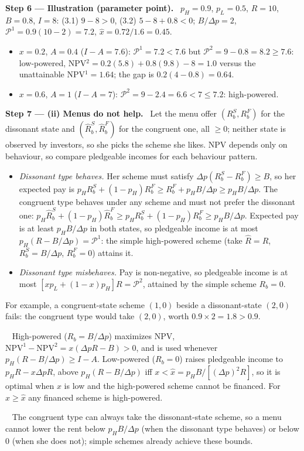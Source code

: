 \documentclass[11pt,a4paper]{article}
\newcommand{\step}[2]{\par\medskip\noindent\textbf{Step #1 --- #2.}~}
\newcommand{\answer}[1]{\par\smallskip\noindent\fbox{\textbf{Answer #1.}}~}
\newcommand{\dpp}{\Delta p}
\begin{document}
\step{6}{Illustration (parameter point)} $p_H=0.9$, $p_L=0.5$, $R=10$, $B=0.8$, $I=8$: (3.1) $9-8>0$, (3.2) $5-8+0.8<0$; $B/\dpp=2$, $\mathcal P^1=0.9(10-2)=7.2$, $\hat x=0.72/1.6=0.45$.
\begin{itemize}
  \item $x=0.2$, $A=0.4$ ($I-A=7.6$): $\mathcal P^1=7.2<7.6$ but $\mathcal P^2=9-0.8=8.2\ge7.6$: low-powered, NPV$^2=0.2(5.8)+0.8(9.8)-8=1.0$ versus the unattainable NPV$^1=1.64$; the gap is $0.2(4-0.8)=0.64$.
  \item $x=0.6$, $A=1$ ($I-A=7$): $\mathcal P^2=9-2.4=6.6<7\le7.2$: high-powered.
\end{itemize}

\step{7}{(ii) Menus do not help} Let the menu offer $(R^S_b,R^F_b)$ for the dissonant state and $(\hat R^S_b,\hat R^F_b)$ for the congruent one, all $\ge0$; neither state is observed by investors, so she picks the scheme she likes. NPV depends only on behaviour, so compare pledgeable incomes for each behaviour pattern.
\begin{itemize}
  \item \emph{Dissonant type behaves.} Her scheme must satisfy $\dpp(R^S_b-R^F_b)\ge B$, so her expected pay is $p_HR^S_b+(1-p_H)R^F_b\ge R^F_b+p_HB/\dpp\ge p_HB/\dpp$. The congruent type behaves under any scheme and must not prefer the dissonant one: $p_H\hat R^S_b+(1-p_H)\hat R^F_b\ge p_HR^S_b+(1-p_H)R^F_b\ge p_HB/\dpp$. Expected pay is at least $p_HB/\dpp$ in both states, so pledgeable income is at most $p_H(R-B/\dpp)=\mathcal P^1$: the simple high-powered scheme (take $\hat R=R$, $R^S_b=B/\dpp$, $R^F_b=0$) attains it.
  \item \emph{Dissonant type misbehaves.} Pay is non-negative, so pledgeable income is at most $[xp_L+(1-x)p_H]R=\mathcal P^2$, attained by the simple scheme $R_b=0$.
\end{itemize}
For example, a congruent-state scheme $(1,0)$ beside a dissonant-state $(2,0)$ fails: the congruent type would take $(2,0)$, worth $0.9\times2=1.8>0.9$.

\answer{(i)} High-powered ($R_b=B/\dpp$) maximizes NPV, $\mathrm{NPV}^1-\mathrm{NPV}^2=x(\dpp R-B)>0$, and is used whenever $p_H(R-B/\dpp)\ge I-A$. Low-powered ($R_b=0$) raises pledgeable income to $p_HR-x\dpp R$, above $p_H(R-B/\dpp)$ iff $x<\hat x=p_HB/[(\dpp)^2R]$, so it is optimal when $x$ is low and the high-powered scheme cannot be financed. For $x\ge\hat x$ any financed scheme is high-powered.
\answer{(ii)} The congruent type can always take the dissonant-state scheme, so a menu cannot lower the rent below $p_HB/\dpp$ (when the dissonant type behaves) or below 0 (when she does not); simple schemes already achieve these bounds.
\end{document}
